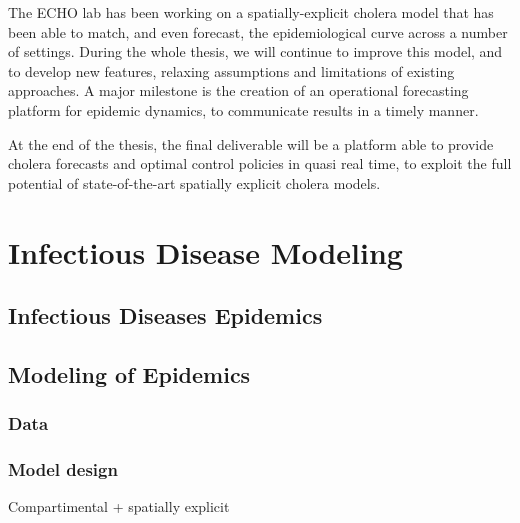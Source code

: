 The ECHO lab has been working on a spatially-explicit cholera model that has been able to match, and even forecast, the epidemiological curve across a number of settings. During the whole thesis, we will continue to improve this model, and to develop new features, relaxing assumptions and limitations of existing approaches. A major milestone is the creation of an operational forecasting platform for epidemic dynamics, to communicate results in a timely manner.


At the end of the thesis, the final deliverable will be a platform able to provide cholera forecasts and optimal control policies in quasi real time, to exploit the full potential of state-of-the-art spatially explicit cholera models.

\chapter{Infectious Disease Modeling}

\section{Infectious Diseases Epidemics} %

\section{Modeling of Epidemics}
\subsection{Data}

\subsection{Model design}
Compartimental + spatially explicit
